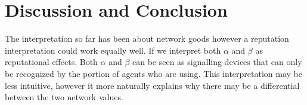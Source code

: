 \documentclass[12pt]{report}
\newtheorem{proposition}{Proposition}
\numberwithin{equation}{section}
\begin{document}







\section{Discussion and Conclusion}
The interpretation so far has been about network goods however a reputation interpretation could work equally well. If we interpret both $\alpha$ and $\beta$ as reputational effects. Both $\alpha$ and $\beta$ can be seen as signalling devices that can only be recognized by the portion of agents who are using. This interpretation may be less intuitive, however it more naturally explains why there may be a differential between the two network values.
\end{document}
